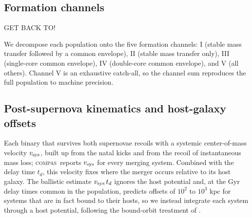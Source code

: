 \documentclass[twocolumn,apj]{openjournal}
\newcommand{\compas}{\textsc{compas}}
\begin{document}
\subsection{Formation channels} \label{sec:channels}

GET BACK TO!

We decompose each population onto the five \citet{broekgaarden2021} formation
channels: I (stable mass transfer followed by a common envelope), II (stable mass
transfer only), III (single-core common envelope), IV (double-core common
envelope), and V (all others). Channel V is an exhaustive catch-all, so the
channel sum reproduces the full population to machine precision.

\subsection{Post-supernova kinematics and host-galaxy offsets} \label{sec:kinematics}

Each binary that survives both supernovae recoils with a systemic
center-of-mass velocity $v_{\rm sys}$, built up from the natal kicks and from
the \citet{blaauw1961} recoil of instantaneous mass loss; \compas\ reports
$v_{\rm sys}$ for every merging system. Combined with the delay time $t_d$,
this velocity fixes where the merger occurs relative to its host galaxy. The
ballistic estimate $v_{\rm sys}\,t_d$ ignores the host potential and, at the
Gyr delay times common in the population, predicts offsets of $10^2$ to
$10^3$ kpc for systems that are in fact bound to their hosts, so we instead
integrate each system through a host potential, following the bound-orbit
treatment of \citet{bloom1999}.
\end{document}
